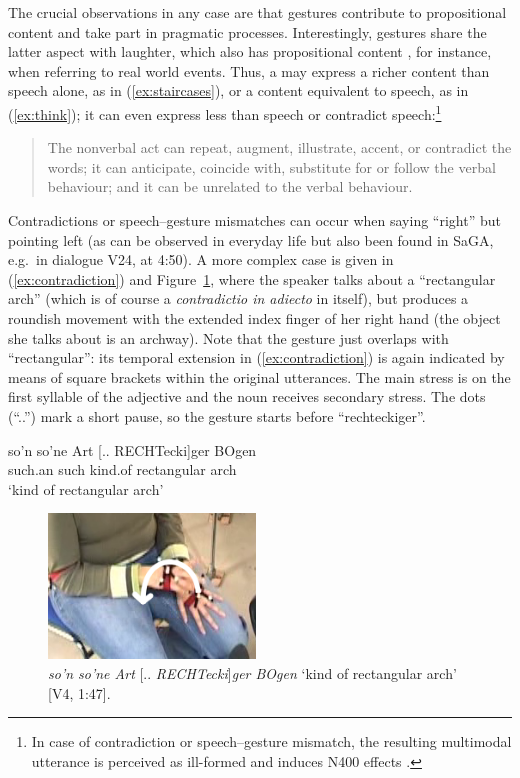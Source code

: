 \documentclass[output=paper,biblatex,babelshorthands,newtxmath,draftmode,colorlinks,citecolor=brown]{langscibook}
\begin{document}
The crucial observations in any case are that gestures contribute to propositional content and take part in pragmatic processes.
%
Interestingly, gestures share the latter aspect with laughter, which also has propositional content \citep{Ginzburg:Breitholz:Cooper:Hough:Tian:2015}, for instance, when referring to real world events.
%
Thus, a  may express a richer content than speech alone, as in (\ref{ex:staircases}), or a content equivalent to speech, as in (\ref{ex:think}); it can even express less than speech or contradict speech:\footnote{In case of contradiction or speech--gesture mismatch, the resulting multimodal utterance is perceived as ill-formed and induces N400 effects \citep{Wu:Coulson:2005,Kelly:Kravitz:Hopkins:2004}.}
%
\begin{quote}
The nonverbal act can repeat, augment, illustrate, accent, or contradict the words; it can anticipate, coincide with, substitute for or follow the verbal behaviour; and it can be unrelated to the verbal behaviour.\hfill 
\citep[53]{Ekman:Friesen:1969}
\end{quote}

\largerpage
\noindent 
Contradictions or speech--gesture mismatches can occur when saying \enquote{right} but
pointing left (as can be observed in everyday life but also been found in SaGA, e.g.\ in dialogue
V24, at 4:50).  A more complex case is given in (\ref{ex:contradiction}) and
Figure~\ref{fig:contradiction}, where the speaker talks about a \enquote{rectangular arch} (which is
of course a \textit{contradictio in adiecto} in itself), but produces a roundish movement with the
extended index finger of her right hand (the object she talks about is an archway).  Note that the
gesture just overlaps with \enquote{rectangular}: its temporal extension in (\ref{ex:contradiction})
is again indicated by means of square brackets within the original  utterances.  The
main stress is on the first syllable of the adjective and the noun receives secondary stress.  The
dots (\enquote{..}) mark a short pause, so the gesture starts before \enquote{rechteckiger}.

\ea \label{ex:contradiction}
\gll 
 so'n so'ne Art {[.. RECHTecki]ger} BOgen \\
such.an such kind.of rectangular arch \\
\glt 
\enquote*{kind of rectangular arch}
\z

\begin{figure}
  \centering
  \includegraphics[width=5.5cm]{figures/rechteckiger-Bogen-path}
  \caption[Rectangular arch]{\textit{so'n so'ne Art} [.. \textit{RECHTecki}]\textit{ger BOgen} \enquote*{kind of rectangular arch} [V4, 1:47].}
  \label{fig:contradiction}
\end{figure}
\end{document}
